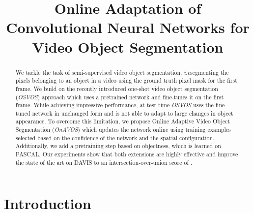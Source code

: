 \documentclass{bmvc2k}
\title{Online Adaptation of Convolutional Neural Networks for Video Object Segmentation}
\newcommand{\methodname}[1]{\mbox{\emph{#1}}}
\def\ie{\emph{i.e}\bmvaOneDot}
\begin{document}
\maketitle

\begin{abstract}
We tackle the task of semi-supervised video object segmentation, \ie segmenting the pixels belonging to an object in a video using the ground truth pixel mask for the first frame. We build on the recently introduced one-shot video object segmentation (\methodname{OSVOS}) approach  which uses a pretrained network and fine-tunes it on the first frame. While achieving impressive performance, at test time \methodname{OSVOS} uses the fine-tuned network in unchanged form and is not able to adapt to large changes in object appearance. To overcome this limitation, we propose Online Adaptive Video Object Segmentation (\methodname{OnAVOS}) which updates the network online using training examples selected based on the confidence of the network and the spatial configuration.
Additionally, we add a pretraining step based on objectness, which is learned on PASCAL. Our experiments show that both extensions are highly effective and improve the state of the art on DAVIS to an intersection-over-union score of .
\end{abstract}

\section{Introduction}
\label{sec:intro}
\end{document}
